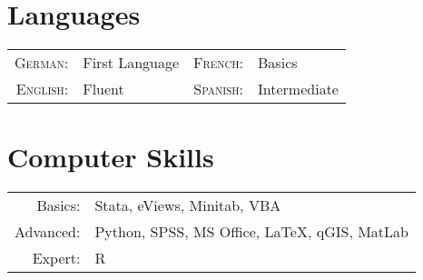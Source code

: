 \documentclass[a4paper,10pt]{article} %
\begin{document}
\section{Languages}

\begin{tabular}{rlrl}
\textsc{German:} & First Language & \textsc{French:} & Basics\\
\textsc{English:} & Fluent &\textsc{Spanish:}& Intermediate\\
\end{tabular}

\section{Computer Skills}
\begin{tabular}{rl}
Basics: & Stata, eViews, Minitab, VBA\\

Advanced: & Python, SPSS, MS Office, LaTeX, qGIS, MatLab\\

Expert: & R
\end{tabular}



\end{document}
